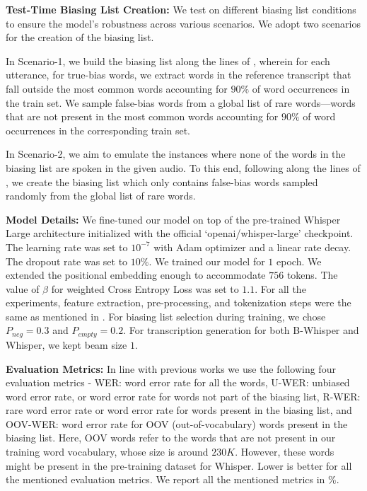 \documentclass{article}
\begin{document}
\textbf{Test-Time Biasing List Creation:} We test on different biasing list conditions to ensure the model's robustness across various scenarios. We adopt two scenarios for the creation of the biasing list.

In Scenario-1, we build the biasing list along the lines of \cite{tcpgen, tang2024improving, trie}, wherein for each utterance, for true-bias words, we extract words in the reference transcript that fall outside the most common words accounting for $90\%$ of word occurrences in the train set. We sample false-bias words from a global list of rare words---words that are not present in the most common words accounting for $90\%$ of word occurrences in the corresponding train set.

In Scenario-2, we aim to emulate the instances where none of the words in the biasing list are spoken in the given audio. To this end, following along the lines of \cite{text-injection}, we create the biasing list which only contains false-bias words sampled randomly from the global list of rare words.

\textbf{Model Details:} We fine-tuned our model on top of the pre-trained Whisper Large architecture initialized with the official `openai/whisper-large' checkpoint. The learning rate was set to $10^{-7}$ with Adam optimizer and a linear rate decay. The dropout rate was set to $10\%$. We trained our model for $1$ epoch. We extended the positional embedding enough to accommodate $756$ tokens. The value of $\beta$ for weighted Cross Entropy Loss was set to $1.1$. For all the experiments, feature extraction, pre-processing, and tokenization steps were the same as mentioned in \cite{whisper}. For biasing list selection during training, we chose $P_{neg}=0.3$ and $P_{empty}=0.2$. For transcription generation for both B-Whisper and Whisper, we kept beam size $1$. 

\textbf{Evaluation Metrics:} In line with previous works \cite{tcpgen, trie, sathyendra2022contextual, shakeel2024contextualized, pointer} we use the following four evaluation metrics - WER: word error rate for all the words, U-WER: unbiased word error rate, or word error rate for words not part of the biasing list, R-WER: rare word error rate or word error rate for words present in the biasing list, and OOV-WER: word error rate for OOV (out-of-vocabulary) words present in the biasing list. Here, OOV words refer to the words that are not present in our training word vocabulary, whose size is around $230K$. However, these words might be present in the pre-training dataset for Whisper. Lower is better for all the mentioned evaluation metrics. We report all the mentioned metrics in \%.
\end{document}
